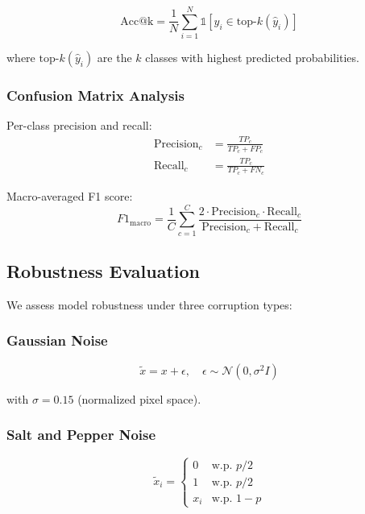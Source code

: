 \begin{equation}
\text{Acc@k} = \frac{1}{N} \sum_{i=1}^N \mathbb{1}[y_i \in \text{top-}k(\hat{y}_i)]
\end{equation}

where $\text{top-}k(\hat{y}_i)$ are the $k$ classes with highest predicted probabilities.

\subsubsection{Confusion Matrix Analysis}

Per-class precision and recall:
\begin{align}
\text{Precision}_c &= \frac{TP_c}{TP_c + FP_c} \\
\text{Recall}_c &= \frac{TP_c}{TP_c + FN_c}
\end{align}

Macro-averaged F1 score:
\begin{equation}
F1_{\text{macro}} = \frac{1}{C}\sum_{c=1}^C \frac{2 \cdot \text{Precision}_c \cdot \text{Recall}_c}{\text{Precision}_c + \text{Recall}_c}
\end{equation}

\subsection{Robustness Evaluation}

We assess model robustness under three corruption types:

\subsubsection{Gaussian Noise}

\begin{equation}
\tilde{x} = x + \epsilon, \quad \epsilon \sim \mathcal{N}(0, \sigma^2 I)
\end{equation}

with $\sigma = 0.15$ (normalized pixel space).

\subsubsection{Salt and Pepper Noise}

\begin{equation}
\tilde{x}_i = \begin{cases}
0 & \text{w.p. } p/2 \\
1 & \text{w.p. } p/2 \\
x_i & \text{w.p. } 1-p
\end{cases}
\end{equation}

